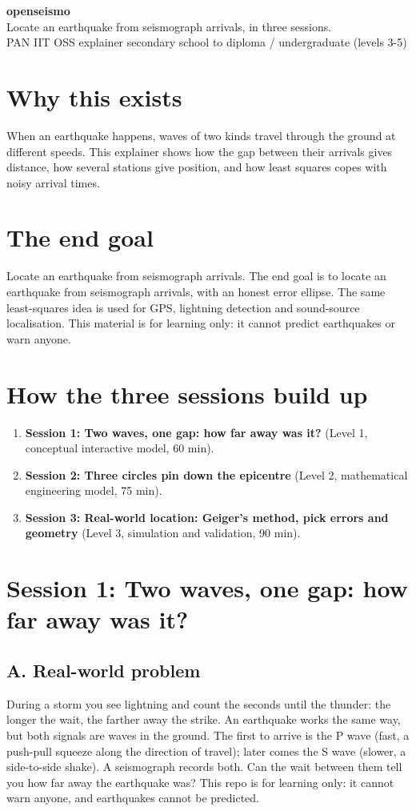\documentclass[11pt,a4paper]{article}
\begin{document}
\begin{center}{\LARGE\bfseries openseismo}\\[0.4em]{\large Locate an earthquake from seismograph arrivals, in three sessions.}\\[0.2em]\small PAN IIT OSS explainer \textbullet{} secondary school to diploma / undergraduate (levels 3-5)\end{center}

\section*{Why this exists}
When an earthquake happens, waves of two kinds travel through the ground at different speeds. This explainer shows how the gap between their arrivals gives distance, how several stations give position, and how least squares copes with noisy arrival times.

\section*{The end goal}
Locate an earthquake from seismograph arrivals. The end goal is to locate an earthquake from seismograph arrivals, with an honest error ellipse. The same least-squares idea is used for GPS, lightning detection and sound-source localisation. This material is for learning only: it cannot predict earthquakes or warn anyone.

\section*{How the three sessions build up}
\begin{enumerate}[nosep]
\item \textbf{Session 1: Two waves, one gap: how far away was it?} (Level 1, conceptual interactive model, 60 min).
\item \textbf{Session 2: Three circles pin down the epicentre} (Level 2, mathematical engineering model, 75 min).
\item \textbf{Session 3: Real-world location: Geiger's method, pick errors and geometry} (Level 3, simulation and validation, 90 min).
\end{enumerate}

\section{Session 1: Two waves, one gap: how far away was it?}

\subsection*{A. Real-world problem}
During a storm you see lightning and count the seconds until the thunder: the longer the wait, the farther away the strike. An earthquake works the same way, but both signals are waves in the ground. The first to arrive is the P wave (fast, a push-pull squeeze along the direction of travel); later comes the S wave (slower, a side-to-side shake). A seismograph records both. Can the wait between them tell you how far away the earthquake was? This repo is for learning only: it cannot warn anyone, and earthquakes cannot be predicted.
\end{document}

